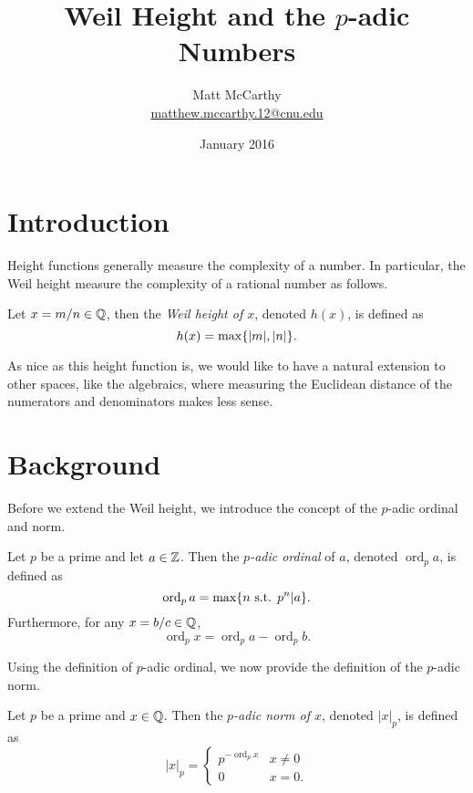 \documentclass[notitlepage]{simple}
\title{Weil Height and the $p$-adic Numbers}
\date{January 2016}
\author{Matt McCarthy\\\href{mailto:matthew.mccarthy.12@cnu.edu}{matthew.mccarthy.12@cnu.edu}}
\def\ord{\operatorname{ord}}
\begin{document}
\maketitle

\section{Introduction}

Height functions generally measure the complexity of a number.
In particular, the Weil height measure the complexity of a rational number as follows.

\begin{definition}\label{weil1}
	Let $x=m/n\in\mathbb{Q}$, then the \textit{Weil height of $x$}, denoted $h(x)$, is defined as
	\[
		h(x)=\max\lbrace |m|,|n| \rbrace.
	\]
\end{definition}

As nice as this height function is, we would like to have a natural extension to other spaces, like the algebraics, where measuring the Euclidean distance of the numerators and denominators makes less sense.

\section{Background}

Before we extend the Weil height, we introduce the concept of the $p$-adic ordinal and norm.

\begin{definition}
	Let $p$ be a prime and let $a\in\mathbb{Z}$.
	Then the \textit{$p$-adic ordinal} of $a$, denoted $\ord_p a$, is defined as
	\[
		\ord_p a = \max\set{n\text{ s.t. } p^n | a}.
	\]
	Furthermore, for any $x=b/c\in\mathbb{Q}$,
	\[
		\ord_p x = \ord_p a - \ord_p b.
	\]
\end{definition}

Using the definition of $p$-adic ordinal, we now provide the definition of the $p$-adic norm.

\begin{definition}
	Let $p$ be a prime and $x\in\mathbb{Q}$.
	Then the \textit{$p$-adic norm of $x$}, denoted $|x|_p$, is defined as
	\[
		|x|_p =
		\begin{cases}
			p^{-\ord_p x} & x\neq 0\\
			0 & x=0.
		\end{cases}
	\]
\end{definition}
\end{document}
